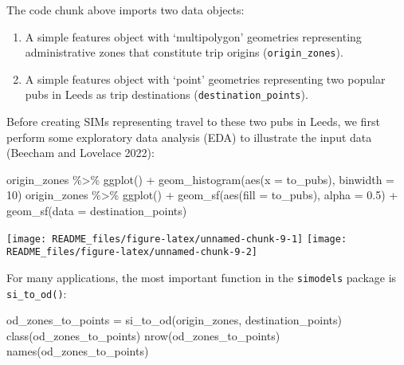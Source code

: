 \documentclass[11pt,letterpaper]{article}
\newenvironment{Shaded}{\begin{snugshade}}{\end{snugshade}}
\newcommand{\AttributeTok}[1]{\textcolor[rgb]{0.77,0.63,0.00}{#1}}
\newcommand{\DecValTok}[1]{\textcolor[rgb]{0.00,0.00,0.81}{#1}}
\newcommand{\FloatTok}[1]{\textcolor[rgb]{0.00,0.00,0.81}{#1}}
\newcommand{\FunctionTok}[1]{\textcolor[rgb]{0.00,0.00,0.00}{#1}}
\newcommand{\NormalTok}[1]{#1}
\newcommand{\OtherTok}[1]{\textcolor[rgb]{0.56,0.35,0.01}{#1}}
\newcommand{\SpecialCharTok}[1]{\textcolor[rgb]{0.00,0.00,0.00}{#1}}
\begin{document}
The code chunk above imports two data objects:

\begin{enumerate}
\def\labelenumi{\arabic{enumi})}
\item
  A simple features object with `multipolygon' geometries representing administrative zones that constitute trip origins (\texttt{origin\_zones}).
\item
  A simple features object with `point' geometries representing two popular pubs in Leeds as trip destinations (\texttt{destination\_points}).
\end{enumerate}

Before creating SIMs representing travel to these two pubs in Leeds, we first perform some exploratory data analysis (EDA) to illustrate the input data (Beecham and Lovelace 2022):

\begin{Shaded}
\begin{Highlighting}[]
\NormalTok{origin\_zones }\SpecialCharTok{\%\textgreater{}\%} 
  \FunctionTok{ggplot}\NormalTok{() }\SpecialCharTok{+}
  \FunctionTok{geom\_histogram}\NormalTok{(}\FunctionTok{aes}\NormalTok{(}\AttributeTok{x =}\NormalTok{ to\_pubs), }\AttributeTok{binwidth =} \DecValTok{10}\NormalTok{)}
\NormalTok{origin\_zones }\SpecialCharTok{\%\textgreater{}\%} 
  \FunctionTok{ggplot}\NormalTok{() }\SpecialCharTok{+}
  \FunctionTok{geom\_sf}\NormalTok{(}\FunctionTok{aes}\NormalTok{(}\AttributeTok{fill =}\NormalTok{ to\_pubs), }\AttributeTok{alpha =} \FloatTok{0.5}\NormalTok{) }\SpecialCharTok{+}
  \FunctionTok{geom\_sf}\NormalTok{(}\AttributeTok{data =}\NormalTok{ destination\_points)}
\end{Highlighting}
\end{Shaded}

\texttt{[image: README\_files/figure-latex/unnamed-chunk-9-1]} \texttt{[image: README\_files/figure-latex/unnamed-chunk-9-2]}

For many applications, the most important function in the \texttt{simodels} package is \texttt{si\_to\_od()}:

\begin{Shaded}
\begin{Highlighting}[]
\NormalTok{od\_zones\_to\_points }\OtherTok{=} \FunctionTok{si\_to\_od}\NormalTok{(origin\_zones, destination\_points)}
\FunctionTok{class}\NormalTok{(od\_zones\_to\_points)}
\FunctionTok{nrow}\NormalTok{(od\_zones\_to\_points)}
\FunctionTok{names}\NormalTok{(od\_zones\_to\_points)}
\end{Highlighting}
\end{Shaded}
\end{document}
